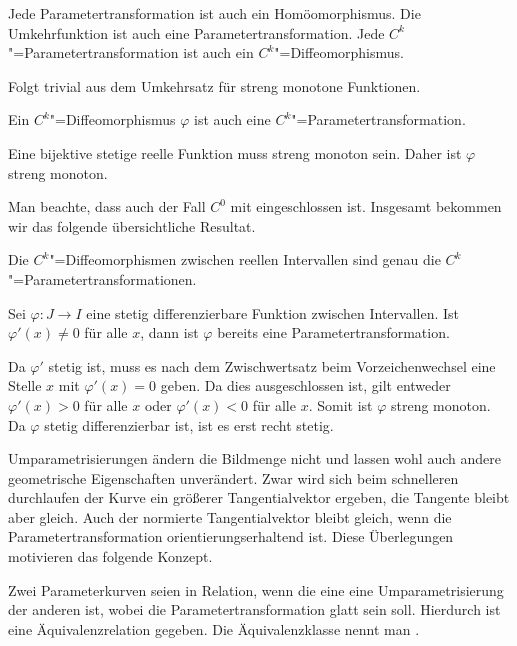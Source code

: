 \begin{corollary}
Jede Parametertransformation ist auch ein
Homöomorphismus. Die Umkehrfunktion ist auch eine
Parametertransformation. Jede $C^k$"=Parametertransformation
ist auch ein $C^k$"=Diffeomorphismus.
\end{corollary}

\noindent{}
Folgt trivial aus dem Umkehrsatz für streng monotone
Funktionen.\;\qedsymbol

\begin{corollary}
Ein $C^k$"=Diffeomorphismus $\varphi$ ist auch eine
$C^k$"=Parametertransformation.
\end{corollary}

\noindent{}
Eine bijektive stetige reelle Funktion muss streng monoton sein.
Daher ist $\varphi$ streng monoton.\;\qedsymbol

Man beachte, dass auch der Fall $C^0$ mit eingeschlossen ist.
Insgesamt bekommen wir das folgende übersichtliche Resultat.

\begin{corollary}
Die $C^k$"=Diffeomorphismen zwischen reellen Intervallen sind
genau die $C^k$"=Parametertransformationen.
\end{corollary}

\begin{corollary}
Sei $\varphi\colon J\to I$ eine stetig differenzierbare
Funktion zwischen Intervallen. Ist $\varphi'(x)\ne 0$ für alle $x$,
dann ist $\varphi$ bereits eine Parametertransformation.
\end{corollary}

\noindent{}
Da $\varphi'$ stetig ist, muss es nach dem Zwischwertsatz beim
Vorzeichenwechsel eine Stelle $x$ mit $\varphi'(x)=0$ geben. Da
dies ausgeschlossen ist, gilt entweder $\varphi'(x)>0$ für alle $x$
oder $\varphi'(x)<0$ für alle $x$. Somit ist $\varphi$ streng monoton.
Da $\varphi$ stetig differenzierbar ist, ist es erst recht
stetig.\;\qedsymbol

Umparametrisierungen ändern die Bildmenge nicht und lassen wohl auch
andere geometrische Eigenschaften unverändert. Zwar wird sich
beim schnelleren durchlaufen der Kurve ein größerer Tangentialvektor
ergeben, die Tangente bleibt aber gleich. Auch der normierte
Tangentialvektor bleibt gleich, wenn die Parametertransformation
orientierungserhaltend ist. Diese Überlegungen motivieren das folgende
Konzept.

\begin{definition}
Zwei Parameterkurven seien in Relation, wenn die eine eine
Umparametrisierung der anderen ist, wobei die Parametertransformation
glatt sein soll. Hierdurch ist eine 
Äquivalenzrelation gegeben. Die Äquivalenzklasse nennt man
.
\end{definition}

